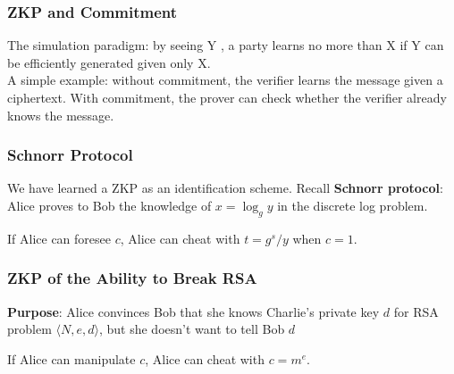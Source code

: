 \begin{frame}\frametitle{ZKP and Commitment}
The simulation paradigm: by seeing Y , a party learns no more than X if Y can be efficiently generated given only X.\\
A simple example: without commitment, the verifier learns the message given a ciphertext. With commitment, the prover can check whether the verifier already knows the message.
\begin{figure}
\begin{center}

\end{center}
\end{figure} 
\end{frame}
\begin{frame}\frametitle{Schnorr Protocol}
We have learned a ZKP as an identification scheme. Recall \textbf{Schnorr protocol}: Alice proves to Bob the knowledge of $x=\log_gy$ in the discrete log problem.
\begin{figure}
\begin{center}

\end{center}
\end{figure}
If Alice can foresee $c$, Alice can cheat with $t=g^s/y$ when $c=1$.
\end{frame}
\begin{frame}\frametitle{ZKP of the Ability to Break RSA}
\textbf{Purpose}: Alice convinces Bob that she knows Charlie's private key $d$ for RSA problem $\langle N,e,d \rangle$, but she doesn't want to tell Bob $d$
\begin{figure}
\begin{center}

\end{center}
\end{figure}
If Alice can manipulate $c$, Alice can cheat with $c = m^e$.
\end{frame}
